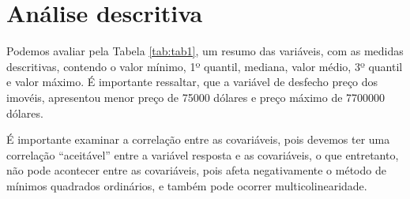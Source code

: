 \documentclass[
]{article}
\begin{document}
\hypertarget{anuxe1lise-descritiva}{%
\section{Análise descritiva}\label{anuxe1lise-descritiva}}

Podemos avaliar pela Tabela \ref{tab:tab1}, um resumo das variáveis, com as medidas descritivas, contendo o valor mínimo, 1º quantil, mediana, valor médio, 3º quantil e valor máximo. É importante ressaltar, que a variável de desfecho preço dos imovéis, apresentou menor preço de 75000 dólares e preço máximo de 7700000 dólares.

É importante examinar a correlação entre as covariáveis, pois devemos ter uma correlação ``aceitável'' entre a variável resposta e as covariáveis, o que entretanto, não pode acontecer entre as covariáveis, pois afeta negativamente o método de mínimos quadrados ordinários, e também pode ocorrer multicolinearidade.
\end{document}
